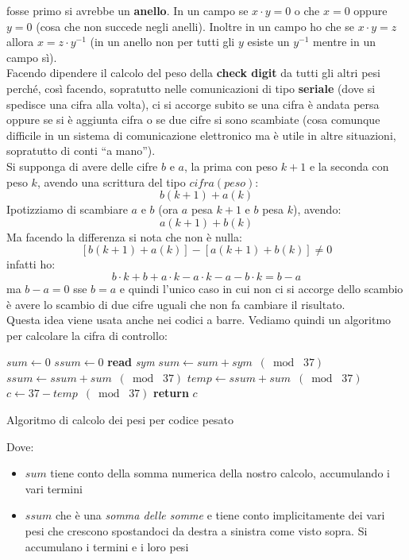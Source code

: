\documentclass[a4paper,12pt, oneside]{book}
\begin{document}
fosse primo si avrebbe un \textbf{anello}. In un campo se $x\cdot y=0$ o che
$x=0$ oppure $y=0$ (cosa che non succede negli anelli). Inoltre in un campo ho
che se $x\cdot y =z$ allora $x=z\cdot y^{-1}$ (in un anello non per tutti gli
$y$ esiste un $y^{-1}$ mentre in un campo sì).\\
Facendo dipendere il calcolo del peso della \textbf{check digit} da tutti gli
altri pesi perché, così facendo, sopratutto nelle comunicazioni di tipo
\textbf{seriale} (dove si spedisce una cifra alla volta), ci si accorge subito
se una cifra è andata persa oppure se si è aggiunta cifra o se due cifre si
sono scambiate (cosa comunque difficile in un sistema di comunicazione
elettronico ma è utile in altre situazioni, sopratutto di conti ``a
mano'').\\
Si supponga di avere delle cifre $b$ e $a$, la prima con peso $k+1$ e la
seconda con peso $k$, avendo una scrittura del tipo $cifra(peso)$:
\[b(k+1)+a(k)\]
Ipotizziamo di scambiare $a$ e $b$ (ora $a$ pesa $k+1$ e $b$ pesa $k$),
avendo:
\[a(k+1)+b(k)\]
Ma facendo la differenza si nota che non è nulla:
\[[b(k+1)+a(k)]-[a(k+1)+b(k)]\neq 0\]
infatti ho:
\[b\cdot k+b+a\cdot k-a\cdot k-a-b\cdot k=b-a\]
ma $b-a=0$ sse $b=a$ e quindi l'unico caso in cui non ci si accorge dello
scambio è avere lo scambio di due cifre uguali che non fa cambiare il
risultato.\\
Questa idea viene usata anche nei codici a barre. Vediamo quindi un algoritmo
per calcolare la cifra di controllo:
\begin{algorithm}[H]
  \begin{algorithmic}
    \State $sum \gets 0$
    \State $ssum \gets 0$
    \State \textbf{read} \textit{sym}
    \State $sum \gets sum+sym\,\,\, (\bmod\,\, 37)$
    \State $ssum \gets ssum+sum\,\,\, (\bmod\,\, 37)$
    \EndWhile
    \State $temp \gets ssum+sum\,\,\, (\bmod\,\, 37)$
    \State $c \gets 37-temp\,\,\, (\bmod\,\, 37)$
    \State \textbf{return} $c$ 
    \EndFunction
  \end{algorithmic}
  \caption{Algoritmo di calcolo dei pesi per codice pesato}
\end{algorithm}
Dove:
\begin{itemize}
  \item $sum$ tiene conto della somma numerica della nostro calcolo, accumulando
  i vari termini 
  \item $ssum$ che è una \textit{somma delle somme} e tiene conto implicitamente
  dei vari pesi che crescono spostandoci da destra a sinistra come visto
  sopra. Si accumulano i termini e i loro pesi
\end{itemize}
\end{document}
